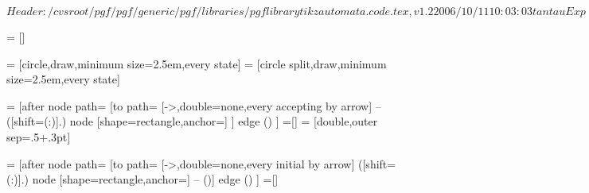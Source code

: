 %
%
%

\ProvidesFileRCS[v\pgfversion] $Header: /cvsroot/pgf/pgf/generic/pgf/libraries/pgflibrarytikzautomata.code.tex,v 1.2 2006/10/11 10:03:03 tantau Exp $



=           []

=  [circle,draw,minimum size=2.5em,every state]
=     [circle split,draw,minimum size=2.5em,every state]

=    [after node path=
{
  {
    [to path=
    {
      [->,double=none,every accepting by arrow]
      --
      ([shift=(\tikz@accepting@angle:\tikz@accepting@distance)]\tikztostart.\tikz@accepting@angle)
          node [shape=rectangle,anchor=\tikz@accepting@anchor] {\tikz@accepting@text}
      }]
    edge ()
  }
}]
=[]
= [double,outer sep=.5\pgflinewidth+.3pt] %

=   [after node path=
{
  {
    [to path=
    {
      [->,double=none,every initial by arrow]
      ([shift=(\tikz@initial@angle:\tikz@initial@distance)]\tikztostart.\tikz@initial@angle)
          node [shape=rectangle,anchor=\tikz@initial@anchor] {\tikz@initial@text}
        -- (\tikztostart)}]
    edge ()
  }
}]
=[]





\def\tikz@initial@text{start}
\def\tikz@accepting@text{}

\def\tikz@initial@distance{3ex}
\def\tikz@accepting@distance{3ex}

